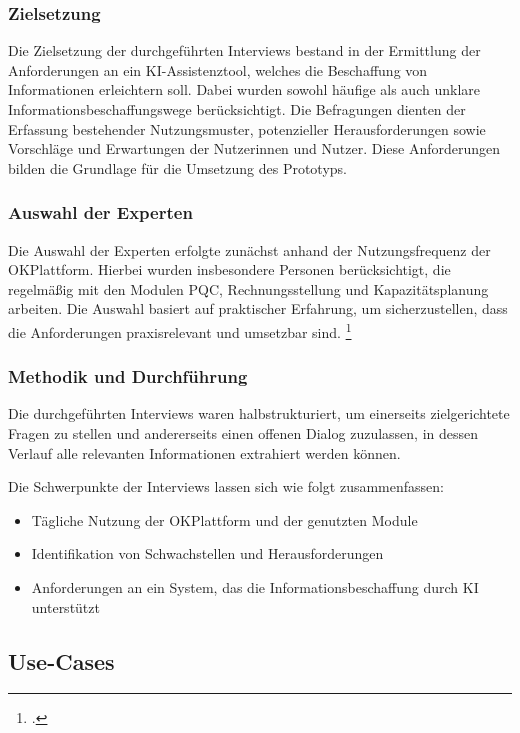 \subsubsection{Zielsetzung}

Die Zielsetzung der durchgeführten Interviews bestand in der Ermittlung der Anforderungen an ein KI-Assistenztool, welches die Beschaffung von Informationen erleichtern soll. Dabei wurden sowohl häufige als auch unklare Informationsbeschaffungswege berücksichtigt. Die Befragungen dienten der Erfassung bestehender Nutzungsmuster, potenzieller Herausforderungen sowie Vorschläge und Erwartungen der Nutzerinnen und Nutzer. Diese Anforderungen bilden die Grundlage für die Umsetzung des Prototyps.

\subsubsection{Auswahl der Experten}

Die Auswahl der Experten erfolgte zunächst anhand der Nutzungsfrequenz der OKPlattform. Hierbei wurden insbesondere Personen berücksichtigt, die regelmäßig mit den Modulen \ac{PQC}, Rechnungsstellung und Kapazitätsplanung arbeiten. Die Auswahl basiert auf praktischer Erfahrung, um sicherzustellen, dass die Anforderungen praxisrelevant und umsetzbar sind. \footcite[5]{wernitz_experteninterview_2018}

\subsubsection{Methodik und Durchführung}

Die durchgeführten Interviews waren halbstrukturiert, um einerseits zielgerichtete Fragen zu stellen und andererseits einen offenen Dialog zuzulassen, in dessen Verlauf alle relevanten Informationen extrahiert werden können.

Die Schwerpunkte der Interviews lassen sich wie folgt zusammenfassen:

\begin{itemize}
    \item Tägliche Nutzung der OKPlattform und der genutzten Module
    \item Identifikation von Schwachstellen und Herausforderungen
    \item Anforderungen an ein System, das die Informationsbeschaffung durch KI unterstützt
\end{itemize}

\subsection{Use-Cases}